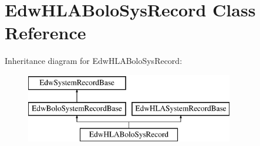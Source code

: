 \hypertarget{class_edw_h_l_a_bolo_sys_record}{
\section{EdwHLABoloSysRecord Class Reference}
\label{class_edw_h_l_a_bolo_sys_record}
}
Inheritance diagram for EdwHLABoloSysRecord:\begin{figure}[H]
\begin{center}
\leavevmode
\includegraphics[height=3cm]{class_edw_h_l_a_bolo_sys_record}
\end{center}
\end{figure}
